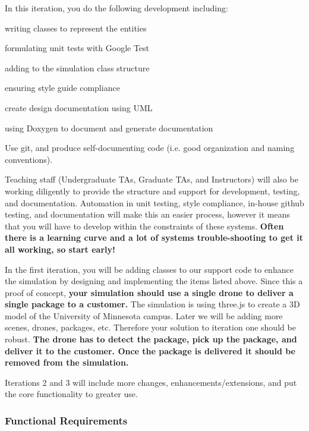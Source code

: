 In this iteration, you do the following development including\+:


\begin{DoxyItemize}
\item writing classes to represent the entities
\item formulating unit tests with Google Test
\item adding to the simulation class structure
\item ensuring style guide compliance
\item create design documentation using U\+ML
\item using Doxygen to document and generate documentation
\item Use git, and produce self-\/documenting code (i.\+e. good organization and naming conventions).
\end{DoxyItemize}

Teaching staff (Undergraduate TA\textquotesingle{}s, Graduate TA\textquotesingle{}s, and Instructors) will also be working diligently to provide the structure and support for development, testing, and documentation. Automation in unit testing, style compliance, in-\/house github testing, and documentation will make this an easier process, however it means that you will have to develop within the constraints of these systems. {\bfseries Often there is a learning curve and a lot of systems trouble-\/shooting to get it all working, so start early!}

In the first iteration, you will be adding classes to our support code to enhance the simulation by designing and implementing the items listed above. Since this a proof of concept, {\bfseries your simulation should use a single drone to deliver a single package to a customer.} The simulation is using three.\+js to create a 3D model of the University of Minnesota campus. Later we will be adding more scenes, drones, packages, etc. Therefore your solution to iteration one should be robust. {\bfseries The drone has to detect the package, pick up the package, and deliver it to the customer. Once the package is delivered it should be removed from the simulation.}

Iterations 2 and 3 will include more changes, enhancements/extensions, and put the core functionality to greater use.

\subsubsection*{Functional Requirements}

